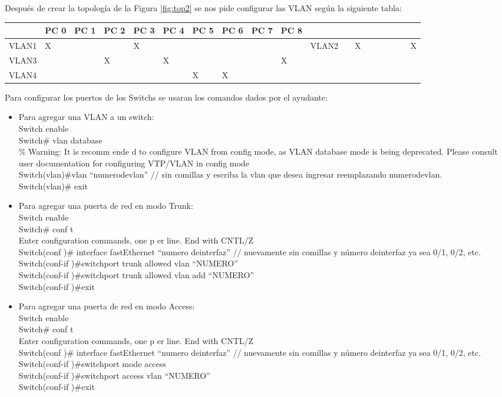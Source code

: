 \documentclass{article}
\begin{document}
Después de crear la topología de la Figura \ref{fig:top2} se nos pide configurar las VLAN según la siguiente tabla:\\
\newline
\begin{tabu} to 1.2\textwidth { | X[l] | X[c] | X[c] | X[c] | X[c] | X[c] | X[c] | X[c] | X[c] | X[c] |  }
 \hline
 & PC 0  & PC 1  & PC 2  & PC 3  & PC 4  & PC 5  & PC 6  & PC 7  & PC 8 \\
 \hline
 VLAN1  & X  & & & X  & & & & & &   
 \hline
 VLAN2  & & X  & & & & & & X  &  \\
 \hline
 VLAN3  & & & X  & & X  & & & & X\\
 \hline
 VLAN4  & & & & & & X  & X  & & &
 \hline
\end{tabu}
Para configurar los puertos de los Switchs se usaran los comandos dados por el ayudante:

\begin{itemize}
\item Para agregar una VLAN a un switch:\\
Switch enable\\
Switch# vlan database\\
\% Warning: It is recomm ende d to configure VLAN from config mode, as VLAN database mode is being deprecated. Please consult user documentation for configuring VTP/VLAN in config mode\\
Switch(vlan)#vlan “numerodevlan” // sin comillas y escriba la vlan que desea ingresar reemplazando numerodevlan.\\
Switch(vlan)# exit
\newpage
\item  Para agregar una puerta de red en modo Trunk:\\
Switch enable\\
Switch\# conf t\\
Enter configuration commands, one p er line. End with CNTL/Z\\
Switch(conf )\# interface fastEthernet “numero deinterfaz” // nuevamente sin comillas y número deinterfaz ya sea 0/1, 0/2, etc.\\
Switch(conf-if )\#switchport trunk allowed vlan “NUMERO”\\
Switch(conf-if )\#switchport trunk allowed vlan add “NUMERO”\\
Switch(conf-if )\#exit
\item Para agregar una puerta de red en modo Access:\\
Switch enable\\
Switch\# conf t\\
Enter configuration commands, one p er line. End with CNTL/Z\\
Switch(conf )\# interface fastEthernet “numero deinterfaz” // nuevamente sin comillas y número deinterfaz ya sea 0/1, 0/2, etc.\\
Switch(conf-if )\#switchport mode access\\
Switch(conf-if )\#switchport access vlan “NUMERO”\\
Switch(conf-if )\#exit

\end{itemize}
\end{document}
